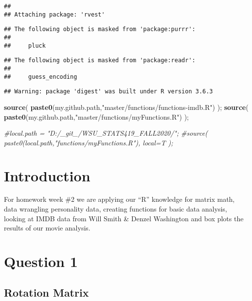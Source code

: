 \documentclass{article}
\newenvironment{Shaded}{\begin{snugshade}}{\end{snugshade}}
\newcommand{\CommentTok}[1]{\textcolor[rgb]{0.56,0.35,0.01}{\textit{#1}}}
\newcommand{\KeywordTok}[1]{\textcolor[rgb]{0.13,0.29,0.53}{\textbf{#1}}}
\newcommand{\NormalTok}[1]{#1}
\newcommand{\StringTok}[1]{\textcolor[rgb]{0.31,0.60,0.02}{#1}}
\begin{document}
\begin{verbatim}
## 
## Attaching package: 'rvest'
\end{verbatim}

\begin{verbatim}
## The following object is masked from 'package:purrr':
## 
##     pluck
\end{verbatim}

\begin{verbatim}
## The following object is masked from 'package:readr':
## 
##     guess_encoding
\end{verbatim}

\begin{verbatim}
## Warning: package 'digest' was built under R version 3.6.3
\end{verbatim}

\begin{Shaded}
\begin{Highlighting}[]
\KeywordTok{source}\NormalTok{( }\KeywordTok{paste0}\NormalTok{(my.github.path,}\StringTok{"master/functions/functions-imdb.R"}\NormalTok{) );}
\KeywordTok{source}\NormalTok{( }\KeywordTok{paste0}\NormalTok{(my.github.path,}\StringTok{"master/functions/myFunctions.R"}\NormalTok{) );}

\CommentTok{#local.path = "D:/_git_/WSU_STATS419_FALL2020/";}
\CommentTok{#source( paste0(local.path,"functions/myFunctions.R"), local=T );}
\end{Highlighting}
\end{Shaded}

\hypertarget{introduction}{%
\section{Introduction}\label{introduction}}

For homework week \#2 we are applying our ``R'' knowledge for matrix
math, data wrangling personality data, creating functions for basic data
analysis, looking at IMDB data from Will Smith \& Denzel Washington and
box plots the results of our movie analysis.

\newpage

\hypertarget{question-1}{%
\section{\texorpdfstring{\textbf{Question
1}}{Question 1}}\label{question-1}}

\hypertarget{rotation-matrix}{%
\subsection{Rotation Matrix}\label{rotation-matrix}}
\end{document}
